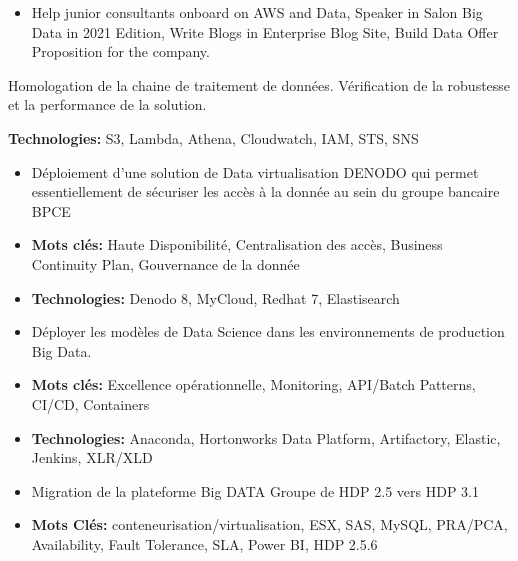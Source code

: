 \documentclass[10pt,a4paper,normalphoto]{altacv}
\begin{document}
\begin{paracol}{2}
\begin{itemize}
    \item Help junior consultants onboard on AWS and Data, Speaker in Salon Big Data in 2021 Edition,  Write Blogs in Enterprise Blog Site, Build Data Offer Proposition for the company.
\end{itemize}
\divider

\item Homologation de la chaine de traitement de données. Vérification de la robustesse et la performance de la solution.
\item \textbf{Technologies:} S3, Lambda, Athena, Cloudwatch, IAM, STS, SNS
\medskip

\divider
{}
\begin{itemize}
\item Déploiement d'une solution de Data virtualisation DENODO qui permet essentiellement de sécuriser les accès à la donnée au sein du groupe bancaire BPCE
\item \textbf{Mots clés:} Haute Disponibilité, Centralisation des accès, Business Continuity Plan, Gouvernance de la donnée  
\item \textbf{Technologies:} Denodo 8, MyCloud, Redhat 7, Elastisearch
\medskip
\end{itemize}
\divider

\begin{itemize}
\item Déployer les modèles de Data Science dans les environnements de production Big Data.
\item \textbf{Mots clés:} Excellence opérationnelle, Monitoring, API/Batch Patterns, CI/CD, Containers
\item \textbf{Technologies:} Anaconda, Hortonworks Data Platform, Artifactory, Elastic, Jenkins, XLR/XLD
\medskip
\end{itemize}

\divider
{}
\begin{itemize}
\item Migration de la plateforme Big DATA Groupe de HDP 2.5 vers HDP 3.1
\item \textbf{Mots Clés:} conteneurisation/virtualisation, ESX, SAS, MySQL, PRA/PCA, Availability, Fault Tolerance, SLA, Power BI, HDP 2.5.6
\end{itemize}


\end{paracol}
\end{document}
